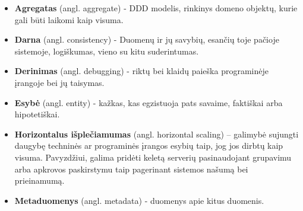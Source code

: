 \begin{itemize}

  \item \textbf{Agregatas} (angl. aggregate) - DDD modelis, rinkinys domeno objektų, kurie gali būti laikomi kaip visuma.

  \item \textbf{Darna} (angl. consistency) - Duomenų ir jų savybių, esančių toje pačioje sistemoje, logiškumas, vieno su kitu suderintumas.

  \item \textbf{Derinimas} (angl. debugging) - riktų bei klaidų paieška programinėje įrangoje bei jų taisymas.

  \item \textbf{Esybė} (angl. entity) - kažkas, kas egzistuoja pats savaime, faktiškai arba hipotetiškai.

  \item \textbf{Horizontalus išplečiamumas} (angl. horizontal scaling) – galimybė sujungti daugybę techninės ar programinės įrangos esybių taip, jog jos dirbtų kaip visuma. Pavyzdžiui, galima pridėti keletą serverių pasinaudojant grupavimu arba apkrovos paskirstymu taip pagerinant sistemos našumą bei prieinamumą.

  \item \textbf{Metaduomenys} (angl. metadata) - duomenys apie kitus duomenis.

\end{itemize}
